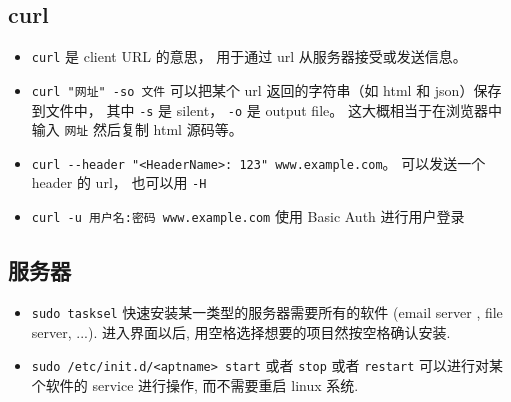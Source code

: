 \subsection{curl}
\begin{itemize}
\item \verb|curl| 是 client URL 的意思， 用于通过 url 从服务器接受或发送信息。
\item \verb|curl "网址" -so 文件| 可以把某个 url 返回的字符串（如 html 和 json）保存到文件中， 其中 \verb|-s| 是 silent， \verb|-o| 是 output file。 这大概相当于在浏览器中输入 \verb|网址| 然后复制 html 源码等。
\item \verb|curl --header "<HeaderName>: 123" www.example.com|。 可以发送一个 header 的 url， 也可以用 \verb|-H|
\item \verb|curl -u 用户名:密码 www.example.com| 使用 Basic Auth 进行用户登录
\end{itemize}

\subsection{服务器}
\begin{itemize}
\item \verb`sudo tasksel` 快速安装某一类型的服务器需要所有的软件 (email server , file server, ...). 进入界面以后, 用空格选择想要的项目然按空格确认安装.
\item \verb`sudo /etc/init.d/<aptname> start` 或者 \verb`stop` 或者 \verb`restart` 可以进行对某个软件的 service 进行操作, 而不需要重启 linux 系统.
\end{itemize}

